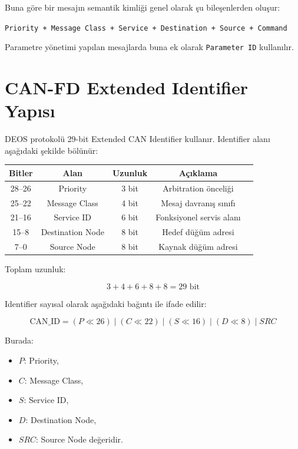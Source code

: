 \documentclass[a4paper,10pt]{article}
\newcommand{\code}[1]{\texttt{#1}}
\begin{document}
Buna göre bir mesajın semantik kimliği genel olarak şu bileşenlerden oluşur:

\begin{center}
\code{Priority + Message Class + Service + Destination + Source + Command}
\end{center}

Parametre yönetimi yapılan mesajlarda buna ek olarak \code{Parameter ID} kullanılır.

\section{CAN-FD Extended Identifier Yapısı}

DEOS protokolü 29-bit Extended CAN Identifier kullanır. Identifier alanı aşağıdaki
şekilde bölünür:

\begin{center}
\begin{tabular}{c c c c c}
\toprule
Bitler & Alan & Uzunluk & Açıklama \\
\midrule
28--26 & Priority & 3 bit & Arbitration önceliği \\
25--22 & Message Class & 4 bit & Mesaj davranış sınıfı \\
21--16 & Service ID & 6 bit & Fonksiyonel servis alanı \\
15--8  & Destination Node & 8 bit & Hedef düğüm adresi \\
7--0   & Source Node & 8 bit & Kaynak düğüm adresi \\
\bottomrule
\end{tabular}
\end{center}

Toplam uzunluk:

\[
3 + 4 + 6 + 8 + 8 = 29 \text{ bit}
\]

Identifier sayısal olarak aşağıdaki bağıntı ile ifade edilir:

\[
\text{CAN\_ID} =
(P \ll 26)
\;|\;
(C \ll 22)
\;|\;
(S \ll 16)
\;|\;
(D \ll 8)
\;|\;
SRC
\]

Burada:
\begin{itemize}[nosep]
    \item \(P\): Priority,
    \item \(C\): Message Class,
    \item \(S\): Service ID,
    \item \(D\): Destination Node,
    \item \(SRC\): Source Node değeridir.
\end{itemize}
\end{document}
